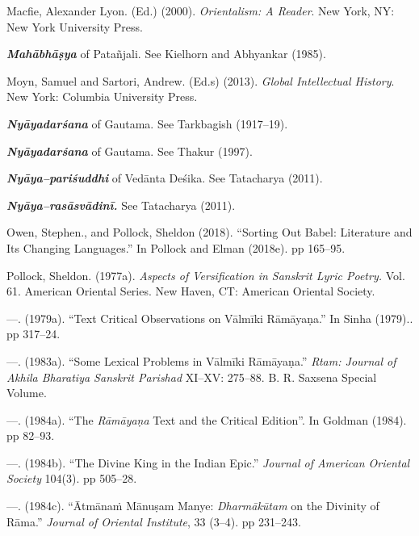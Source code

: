 \begin{thebibliography}{99}
 \item Macfie, Alexander Lyon. (Ed.) (2000).\textit{ Orientalism: A Reader}. New York, NY: New York University Press.

 \item \textit{\textbf{Mahābhāṣya}} of Patañjali. See Kielhorn and Abhyankar (1985).

 \item Moyn, Samuel and Sartori, Andrew. (Ed.s) (2013).\textit{ Global Intellectual History}. New York: Columbia University Press.

 \item \textit{\textbf{Nyāyadarśana}} of Gautama. See Tarkbagish (1917–19).

 \item \textit{\textbf{Nyāyadarśana}} of Gautama. See Thakur (1997).

 \item \textit{\textbf{Nyāya–pariśuddhi}} of Vedānta Deśika. See Tatacharya (2011).

 \item \textit{\textbf{Nyāya–rasāsvādinī.}} See Tatacharya (2011).

 \item Owen, Stephen., and Pollock, Sheldon (2018). “Sorting Out Babel: Literature and Its Changing Languages.” In Pollock and Elman (2018e). pp 165–95.

 \item Pollock, Sheldon. (1977a). \textit{Aspects of Versification in Sanskrit Lyric Poetry.} Vol. 61. American Oriental Series. New Haven, CT: American Oriental Society.

 \item —. (1979a). “Text Critical Observations on Vālmīki Rāmāyaṇa.” In Sinha (1979).. pp 317–24.

 \item —. (1983a). “Some Lexical Problems in Vālmīki Rāmāyaṇa.” \textit{Rtam: Journal of Akhila Bharatiya Sanskrit Parishad} XI–XV: 275–88. B. R. Saxsena Special Volume. 

 \item —. (1984a). “The \textit{Rāmāyaṇa} Text and the Critical Edition”. In Goldman (1984). pp 82–93.

 \item —. (1984b). “The Divine King in the Indian Epic.” \textit{Journal of American Oriental Society} 104(3). pp 505–28.

 \item —. (1984c). “Ātmānaṁ Mānuṣam Manye: \textit{Dharmākūtam} on the Divinity of Rāma.” \textit{Journal of Oriental Institute}, 33 (3–4). pp 231–243.


\end{thebibliography}
